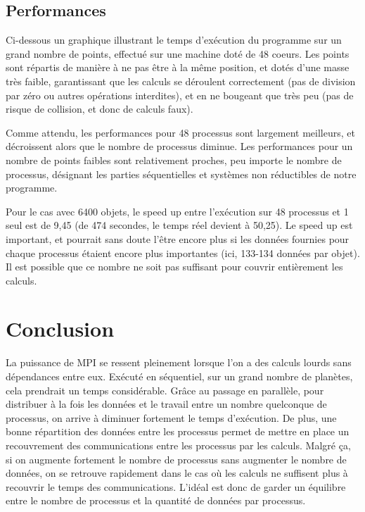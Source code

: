 \documentclass[a4paper,11pt]{article}
\begin{document}
\subsection{Performances}
Ci-dessous un graphique illustrant le temps d'exécution du programme sur un grand nombre de points, effectué sur une machine doté de 48 coeurs. 
Les points sont répartis de manière à ne pas être à la même position, et dotés d'une masse très faible, garantissant que les calculs se déroulent correctement (pas de division par zéro ou autres opérations interdites), et en ne bougeant que très peu (pas de risque de collision, et donc de calculs faux). 


Comme attendu, les performances pour 48 processus sont largement meilleurs, et décroissent alors que le nombre de processus diminue.
Les performances pour un nombre de points faibles sont relativement proches, peu importe le nombre de processus, désignant les parties séquentielles et systèmes non réductibles de notre programme.

Pour le cas avec 6400 objets, le speed up entre l'exécution sur 48 processus et 1 seul est de 9,45 (de 474 secondes, le temps réel devient à 50,25).
Le speed up est important, et pourrait sans doute l'être encore plus si les données fournies pour chaque processus étaient encore plus importantes (ici, 133-134 données par objet).
Il est possible que ce nombre ne soit pas suffisant pour couvrir entièrement les calculs.

\section{Conclusion}

La puissance de MPI se ressent pleinement lorsque l'on a des calculs lourds sans dépendances entre eux. Exécuté en séquentiel, sur un grand nombre de planètes, cela prendrait un temps considérable. Grâce au passage en parallèle, pour distribuer à la fois les données et le travail entre un nombre quelconque de processus, on arrive à diminuer fortement le temps d'exécution. De plus, une bonne répartition des données entre les processus permet de mettre en place un recouvrement des communications entre les processus par les calculs. Malgré ça, si on augmente fortement le nombre de processus sans augmenter le nombre de données, on se retrouve rapidement dans le cas où les calculs ne suffisent plus à recouvrir le temps des communications. L'idéal est donc de garder un équilibre entre le nombre de processus et la quantité de données par processus.
\end{document}
